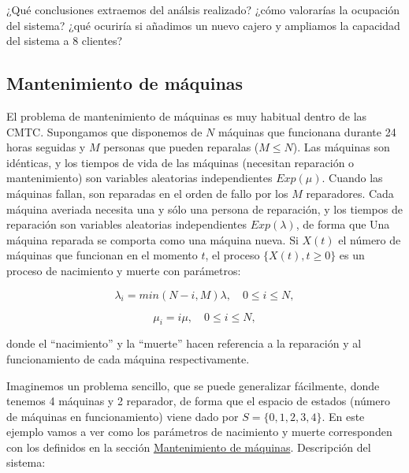 \documentclass[
]{book}
\theoremstyle{definition}
\theoremstyle{definition}
\theoremstyle{definition}
\theoremstyle{definition}
\theoremstyle{remark}
\begin{document}
¿Qué conclusiones extraemos del análsis realizado? ¿cómo valorarías la ocupación del sistema? ¿qué ocuriría si añadimos un nuevo cajero y ampliamos la capacidad del sistema a 8 clientes?

\hypertarget{excmtc007}{%
\subsection{Mantenimiento de máquinas}\label{excmtc007}}

El problema de mantenimiento de máquinas es muy habitual dentro de las CMTC. Supongamos que disponemos de \(N\) máquinas que funcionana durante 24 horas seguidas y \(M\) personas que pueden reparalas (\(M \leq N\)). Las máquinas son idénticas, y los tiempos de vida de las máquinas (necesitan reparación o mantenimiento) son variables aleatorias independientes \(Exp(\mu)\). Cuando las máquinas fallan, son reparadas en el orden de fallo por los \(M\) reparadores. Cada máquina averiada necesita una y sólo una persona de reparación, y los tiempos de reparación son variables aleatorias independientes \(Exp(\lambda)\), de forma que Una máquina reparada se comporta como una máquina nueva. Si \(X(t)\) el número de máquinas que funcionan en el momento \(t\), el proceso \(\{X(t), t \geq 0\}\) es un proceso de nacimiento y muerte con parámetros:

\[\lambda_i = min(N-i, M)\lambda, \quad 0 \leq i \leq N,\]

\[\mu_i = i\mu, \quad 0 \leq i \leq N,\]

donde el ``nacimiento'' y la ``muerte'' hacen referencia a la reparación y al funcionamiento de cada máquina respectivamente.

Imaginemos un problema sencillo, que se puede generalizar fácilmente, donde tenemos 4 máquinas y 2 reparador, de forma que el espacio de estados (número de máquinas en funcionamiento) viene dado por \(S = \{0, 1, 2, 3, 4\}\). En este ejemplo vamos a ver como los parámetros de nacimiento y muerte corresponden con los definidos en la sección \protect\hyperlink{excmtc007}{Mantenimiento de máquinas}. Descripción del sistema:
\end{document}

